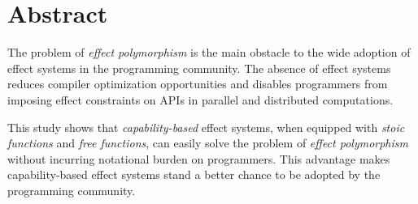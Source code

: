 \section*{\centering Abstract}

The problem of \emph{effect polymorphism} is the main obstacle to the
wide adoption of effect systems in the programming community. The
absence of effect systems reduces compiler optimization opportunities
and disables programmers from imposing effect constraints on APIs in
parallel and distributed computations.

This study shows that \emph{capability-based} effect systems, when
equipped with \emph{stoic functions} and \emph{free functions}, can
easily solve the problem of \emph{effect polymorphism} without
incurring notational burden on programmers. This advantage makes
capability-based effect systems stand a better chance to be adopted by
the programming community.
